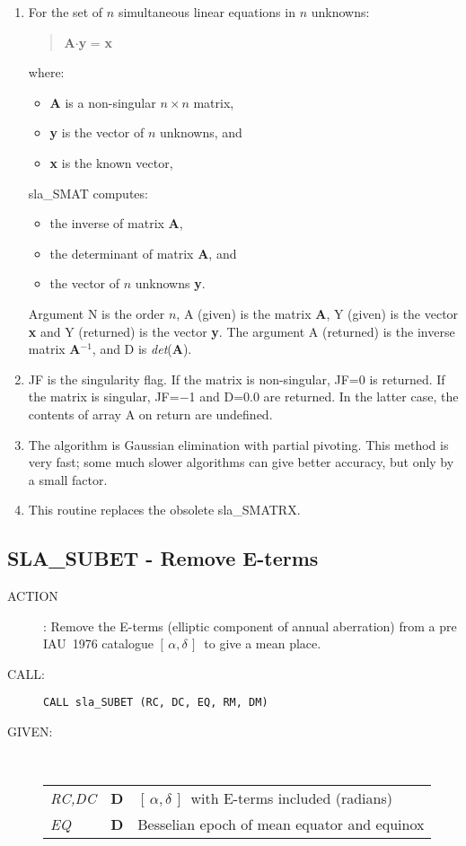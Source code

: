 \documentclass[11pt,twoside]{article}
\newcommand{\xlabel}[1]{}
\newcommand{\radec}     {$[\,\alpha,\delta\,]$}
\newcommand{\routine}[3]
{\hbadness=10000
  \vbox
  {
    \rule{\textwidth}{0.3mm}\\
    {\Large {\bf #1} \hfill #2 \hfill {\bf #1}}\\
    \setlength{\oldspacing}{\topsep}
    \setlength{\topsep}{0.3ex}
    \begin{description}
      #3
    \end{description}
    \setlength{\topsep}{\oldspacing}
  }
}
\renewcommand{\routine}[3]
   {
      \subsection{#1\xlabel{#1} - #2\label{#1}}
       \begin{description}
         #3
       \end{description}
   }
\newcommand{\action}[1]
{\item[ACTION]: #1}
\newcommand{\action}[1]
   {\item[ACTION:] #1}
\newcommand{\call}[1]
{\item[CALL]: \hspace{0.4em}{\tt #1}}
\newlength{\oldspacing}
\renewcommand{\call}[1]
   {
    \item[CALL:] {\tt #1}
   }
\newcommand{\args}[2]
{
  \goodbreak
  \setlength{\oldspacing}{\topsep}
  \setlength{\topsep}{0.3ex}
  \begin{description}
  \item[#1]:\\[1.5ex]
    \begin{tabular}{p{7em}p{6em}p{22em}}
      #2
    \end{tabular}
  \end{description}
  \setlength{\topsep}{\oldspacing}
}
\renewcommand{\args}[2]
   {
     \begin{description}
        \item[#1:]\\
        \begin{tabular}{p{7em}p{6em}l}
           #2
        \end{tabular}
     \end{description}
   }
\newcommand{\spec}[3]
{
  {\em {#1}} & {\bf \mbox{#2}} & {#3}
}
\begin{document}
{
 \begin{enumerate}
  \item For the set of $n$ simultaneous linear equations in $n$ unknowns:
        \begin{verse}
         {\bf A}$\cdot${\bf y} = {\bf x}
        \end{verse}
        where:
        \begin{itemize}
         \item {\bf A} is a non-singular $n \times n$ matrix,
         \item {\bf y} is the vector of $n$ unknowns, and
         \item {\bf x} is the known vector,
        \end{itemize}
        sla\_SMAT computes:
        \begin{itemize}
         \item the inverse of matrix {\bf A},
         \item the determinant of matrix {\bf A}, and
         \item the vector of $n$ unknowns {\bf y}.
        \end{itemize}
        Argument N is the order $n$, A (given) is the matrix {\bf A},
        Y (given) is the vector {\bf x} and Y (returned)
        is the vector {\bf y}.
        The argument A (returned) is the inverse matrix {\bf A}$^{-1}$,
        and D is {\it det}\/({\bf A}).
  \item JF is the singularity flag.  If the matrix is non-singular,
        JF=0 is returned.  If the matrix is singular, JF=$-$1
        and D=0.0 are returned.  In the latter case, the contents
        of array A on return are undefined.
  \item The algorithm is Gaussian elimination with partial pivoting.
        This method is very fast;  some much slower algorithms can give
        better accuracy, but only by a small factor.
  \item This routine replaces the obsolete sla\_SMATRX.
 \end{enumerate}
}
\routine{SLA\_SUBET}{Remove E-terms}
{
 \action{Remove the E-terms (elliptic component of annual aberration)
         from a pre IAU~1976 catalogue \radec\ to give a mean place.}
 \call{CALL sla\_SUBET (RC, DC, EQ, RM, DM)}
}
\args{GIVEN}
{
 \spec{RC,DC}{D}{\radec\ with E-terms included (radians)} \\
 \spec{EQ}{D}{Besselian epoch of mean equator and equinox}
}
\end{document}
